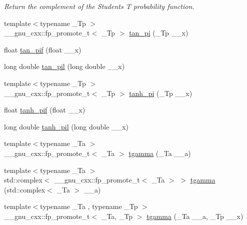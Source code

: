 \begin{DoxyCompactItemize}
\begin{DoxyCompactList}\small\item\em Return the complement of the Students T probability function. \end{DoxyCompactList}\item 
{\footnotesize template$<$typename \+\_\+\+Tp $>$ }\\\+\_\+\+\_\+gnu\+\_\+cxx\+::fp\+\_\+promote\+\_\+t$<$ \+\_\+\+Tp $>$ \hyperlink{group__gnu__math__spec__func_ga12855bd62fe6a955ef0d1d5e92c85ba9}{tan\+\_\+pi} (\+\_\+\+Tp \+\_\+\+\_\+x)
\item 
float \hyperlink{group__gnu__math__spec__func_gaab32e2d76da811451e84232320ddf80c}{tan\+\_\+pif} (float \+\_\+\+\_\+x)
\item 
long double \hyperlink{group__gnu__math__spec__func_ga3546906a5bb8f128c893dddef72e2f20}{tan\+\_\+pil} (long double \+\_\+\+\_\+x)
\item 
{\footnotesize template$<$typename \+\_\+\+Tp $>$ }\\\+\_\+\+\_\+gnu\+\_\+cxx\+::fp\+\_\+promote\+\_\+t$<$ \+\_\+\+Tp $>$ \hyperlink{group__gnu__math__spec__func_ga8729ffd5acf3266315e9dac1b5a9b3a6}{tanh\+\_\+pi} (\+\_\+\+Tp \+\_\+\+\_\+x)
\item 
float \hyperlink{group__gnu__math__spec__func_gab6cbfb582127f997ad9a198903d08889}{tanh\+\_\+pif} (float \+\_\+\+\_\+x)
\item 
long double \hyperlink{group__gnu__math__spec__func_ga4bc71ee5cf3df2ba35e6504027e5c6c6}{tanh\+\_\+pil} (long double \+\_\+\+\_\+x)
\item 
{\footnotesize template$<$typename \+\_\+\+Ta $>$ }\\\+\_\+\+\_\+gnu\+\_\+cxx\+::fp\+\_\+promote\+\_\+t$<$ \+\_\+\+Ta $>$ \hyperlink{group__gnu__math__spec__func_ga73a634663e4eceb1e6bcf3fc16773b7b}{tgamma} (\+\_\+\+Ta \+\_\+\+\_\+a)
\item 
{\footnotesize template$<$typename \+\_\+\+Ta $>$ }\\std\+::complex$<$ \+\_\+\+\_\+gnu\+\_\+cxx\+::fp\+\_\+promote\+\_\+t$<$ \+\_\+\+Ta $>$ $>$ \hyperlink{group__gnu__math__spec__func_gab01fe5b7f1bacdafcad5746ef50af777}{tgamma} (std\+::complex$<$ \+\_\+\+Ta $>$ \+\_\+\+\_\+a)
\item 
{\footnotesize template$<$typename \+\_\+\+Ta , typename \+\_\+\+Tp $>$ }\\\+\_\+\+\_\+gnu\+\_\+cxx\+::fp\+\_\+promote\+\_\+t$<$ \+\_\+\+Ta, \+\_\+\+Tp $>$ \hyperlink{group__gnu__math__spec__func_ga264207c0040cd3877fad455121da8518}{tgamma} (\+\_\+\+Ta \+\_\+\+\_\+a, \+\_\+\+Tp \+\_\+\+\_\+x)

\end{DoxyCompactItemize}
